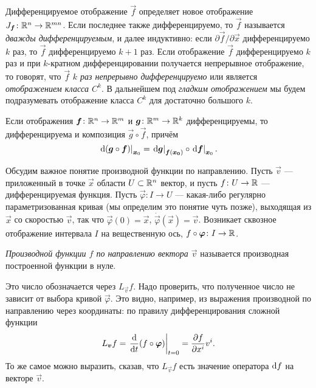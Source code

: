 Дифференцируемое отображение $\vec{f}$ определяет новое отображение $J_{\boldsymbol{f}}\colon \mathbb{R}^n \to \mathbb{R}^{mn}$. Если последнее также дифференцируемо, то $\vec{f}$ называется \textit{дважды дифференцируемым}, и далее индуктивно: если $\partial\vec{f} / \partial\vec{x}$ дифференцируемо $k$ раз, то $\vec{f}$ дифференцируемо $k + 1$ раз. Если отображение $\vec{f}$ дифференцируемо $k$ раз и при $k$-кратном дифференцировании получается непрерывное отображение, то говорят, что $\vec{f}$ \textit{$k$ раз непрерывно дифференцируемо} или является \textit{отображением класса $C^k$}. В дальнейшем под \textit{гладким отображением} мы будем подразумевать отображение класса $C^k$ для достаточно большого $k$.

\begin{theorem}
	Если отображения $\boldsymbol{f}\colon \mathbb{R}^n \to \mathbb{R}^m$ и $\boldsymbol{g}\colon \mathbb{R}^m \to \mathbb{R}^k$ дифференцируемы, то дифференцируема и композиция $\vec{g} \circ \vec{f}$, причём
	\[
		\left.\mathop{}\!\mathrm{d}(\boldsymbol{g} \circ \boldsymbol{f})\right|_{\boldsymbol{x}_0} = \left.\mathop{}\!\mathrm{d}\boldsymbol{g}\right|_{\boldsymbol{f}(\boldsymbol{x_0})} \circ \left.\mathop{}\!\mathrm{d}\boldsymbol{f}\right|_{\boldsymbol{x}_0}.
	\]
\end{theorem}

Обсудим важное понятие производной функции по направлению. Пусть $\vec{v}$ --- приложенный в точке $\vec{x}$ области $U \subset \mathbb{R}^n$ вектор, и пусть $f\colon U \to \mathbb{R}$ --- дифференцируемая функция. Пусть $\vec{\varphi}\colon I \to U$ --- какая-либо регулярно параметризованная кривая (мы определим это понятие чуть позже), выходящая из $\vec{x}$ со скоростью $\vec{v}$, так что $\vec{\varphi}(0) = \vec{x}$, $\dot{\vec{\varphi}}(\vec{x}) = \vec{v}$. Возникает сквозное отображение интервала $I$ на вещественную ось, $f \circ \boldsymbol{\varphi}\colon I \to \mathbb{R}$.

\begin{definition}
	\textit{Производной функции $f$ по направлению вектора $\vec{v}$} называется производная построенной функции в нуле.
\end{definition}

Это число обозначается через $L_{\vec{v}}f$. Надо проверить, что полученное число не зависит от выбора кривой $\vec{\varphi}$. Это видно, например, из выражения производной по направлению через координаты: по правилу дифференцирования сложной функции
\[
	L_{\boldsymbol{v}}f = \left.\frac{\mathop{}\!\mathrm{d}}{\mathop{}\!\mathrm{d} t}(f \circ \boldsymbol{\varphi})\right|_{t = 0} = \frac{\partial f}{\partial x^i}v^i.
\]
То же самое можно выразить, сказав, что $L_{\vec{v}}f$ есть значение оператора $\mathop{}\!\mathrm{d} f$ на векторе $\vec{v}$.

